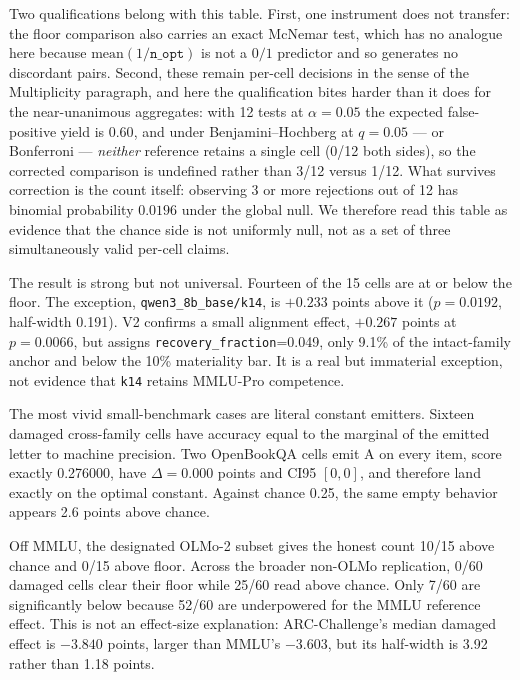 Two qualifications belong with this table. First, one instrument does not transfer: the floor comparison also carries an exact McNemar test, which has no analogue here because $\mathrm{mean}(1/\texttt{n\_opt})$ is not a $0/1$ predictor and so generates no discordant pairs. Second, these remain per-cell decisions in the sense of the Multiplicity paragraph, and here the qualification bites harder than it does for the near-unanimous aggregates: with 12 tests at $\alpha=0.05$ the expected false-positive yield is $0.60$, and under Benjamini--Hochberg at $q=0.05$ --- or Bonferroni --- \emph{neither} reference retains a single cell (0/12 both sides), so the corrected comparison is undefined rather than 3/12 versus 1/12. What survives correction is the count itself: observing 3 or more rejections out of 12 has binomial probability $0.0196$ under the global null. We therefore read this table as evidence that the chance side is not uniformly null, not as a set of three simultaneously valid per-cell claims.

The result is strong but not universal. Fourteen of the 15 cells are at or below the floor. The exception, \texttt{qwen3\_8b\_base/k14}, is $+0.233$ points above it ($p=0.0192$, half-width 0.191). V2 confirms a small alignment effect, $+0.267$ points at $p=0.0066$, but assigns \texttt{recovery\_fraction}=0.049, only 9.1\% of the intact-family anchor and below the 10\% materiality bar. It is a real but immaterial exception, not evidence that \texttt{k14} retains MMLU-Pro competence.

The most vivid small-benchmark cases are literal constant emitters. Sixteen damaged cross-family cells have accuracy equal to the marginal of the emitted letter to machine precision. Two OpenBookQA cells emit A on every item, score exactly 0.276000, have $\Delta=0.000$ points and CI95 $[0,0]$, and therefore land exactly on the optimal constant. Against chance 0.25, the same empty behavior appears 2.6 points above chance.

Off MMLU, the designated OLMo-2 subset gives the honest count 10/15 above chance and 0/15 above floor. Across the broader non-OLMo replication, 0/60 damaged cells clear their floor while 25/60 read above chance. Only 7/60 are significantly below because 52/60 are underpowered for the MMLU reference effect. This is not an effect-size explanation: ARC-Challenge's median damaged effect is $-3.840$ points, larger than MMLU's $-3.603$, but its half-width is 3.92 rather than 1.18 points.



